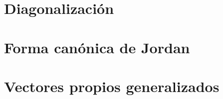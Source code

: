 
\section{Diagonalización}


\section{Forma canónica de Jordan}


\section{Vectores propios generalizados}